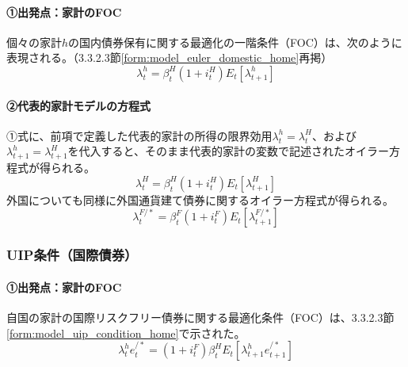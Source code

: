 \paragraph{①出発点：家計のFOC}\label{sec:chapter3_final_equations_utility_euler_origin}
個々の家計\(h\)の国内債券保有に関する最適化の一階条件（FOC）は、次のように表現される。（3.3.2.3節\eqref{form:model_euler_domestic_home}再掲）
\begin{equation}
\lambda_t^h=\beta_t^H(1+i_t^H)E_t[\lambda_{t+1}^h]
\label{form:model_final_equations_utility_euler_restated}
\end{equation}

\paragraph{②代表的家計モデルの方程式}\label{sec:chapter3_final_equations_utility_euler_ra_eq}
①式に、前項で定義した代表的家計の所得の限界効用\(\lambda_t^h=\lambda_t^H\)、および\(\lambda_{t+1}^h=\lambda_{t+1}^H\)を代入すると、そのまま代表的家計の変数で記述されたオイラー方程式が得られる。
\begin{equation}
\lambda_t^H=\beta_t^H(1+i_t^H)E_t[\lambda_{t+1}^H]
\label{form:model_final_equations_utility_euler_h}
\end{equation}
外国についても同様に外国通貨建て債券に関するオイラー方程式が得られる。
\begin{equation}
\lambda_t^{F/*}=\beta_t^F(1+i_t^F)E_t[\lambda_{t+1}^{F/*}]
\label{form:model_final_equations_utility_euler_f}
\end{equation}

\subsubsection{UIP条件（国際債券）}
\label{sec:chapter3_final_equations_utility_uip}
\paragraph{①出発点：家計のFOC}\label{sec:chapter3_final_equations_utility_uip_origin}
自国の家計の国際リスクフリー債券に関する最適化条件（FOC）は、3.3.2.3節\eqref{form:model_uip_condition_home}で示された。
\begin{equation}
\lambda_t^he_t^{/*}=(1+i_t^F)\beta_t^HE_t[\lambda_{t+1}^he_{t+1}^{/*}]
\label{form:model_final_equations_utility_uip_restated}
\end{equation}

